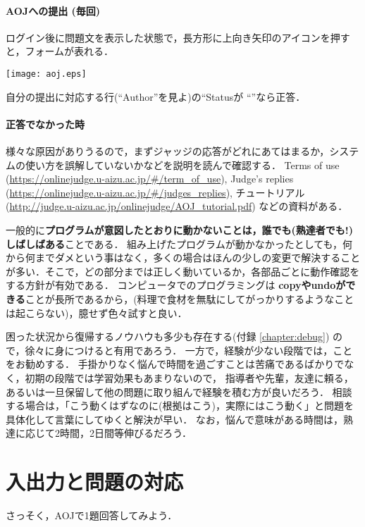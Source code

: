 \paragraph{AOJへの提出 (毎回)}

ログイン後に問題文を表示した状態で，長方形に上向き矢印のアイコンを押す
と，フォームが表れる．

\texttt{[image: aoj.eps]}


自分の提出に対応する行(``Author''を見よ)の``Statusが ``''なら正答．


\paragraph{正答でなかった時}

様々な原因がありうるので，まずジャッジの応答がどれにあてはまるか，システムの使い方を誤解していないかなどを説明を読んで確認する．
Terms of use
(\url{https://onlinejudge.u-aizu.ac.jp/#/term_of_use}),
Judge's replies (\url{https://onlinejudge.u-aizu.ac.jp/#/judges_replies}),
チュートリアル (\url{http://judge.u-aizu.ac.jp/onlinejudge/AOJ_tutorial.pdf})
などの資料がある．

一般的に\textbf{プログラムが意図したとおりに動かないことは，誰でも(熟達者でも!)しばしばある}ことである．
組み上げたプログラムが動かなかったとしても，何から何までダメという事はなく，多くの場合はほんの少しの変更で解決することが多い．そこで，どの部分までは正しく動いているか，各部品ごとに動作確認をする方針が有効である．
コンピュータでのプログラミングは \textbf{copyやundoができる}ことが長所であるから，(料理で食材を無駄にしてがっかりするようなことは起こらない)，臆せず色々試すと良い．

困った状況から復帰するノウハウも多少も存在する(付録 \ref{chapter:debug})
ので，徐々に身につけると有用であろう．
一方で，経験が少ない段階では，ことをお勧めする．
手掛かりなく悩んで時間を過ごすことは苦痛であるばかりでなく，初期の段階では学習効果もあまりないので，
指導者や先輩，友達に頼る，あるいは一旦保留して他の問題に取り組んで経験を積む方が良いだろう．
相談する場合は，「こう動くはずなのに(根拠はこう)，実際にはこう動く」と問題を具体化して言葉にしてゆくと解決が早い．
なお，悩んで意味がある時間は，熟達に応じて2時間，2日間等伸びるだろう．

\section{入出力と問題の対応}

さっそく，AOJで1題回答してみよう．

